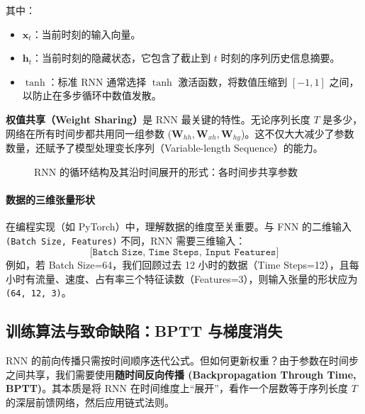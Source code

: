 其中：
\begin{itemize}
    \item $\mathbf{x}_t$：当前时刻的输入向量。
    \item $\mathbf{h}_t$：当前时刻的隐藏状态，它包含了截止到 $t$ 时刻的序列历史信息摘要。
    \item $\tanh$：标准 RNN 通常选择 $\tanh$ 激活函数，将数值压缩到 $[-1, 1]$ 之间，以防止在多步循环中数值发散。
\end{itemize}

\textbf{权值共享（Weight Sharing）}是 RNN 最关键的特性。无论序列长度 $T$ 是多少，网络在所有时间步都共用同一组参数 ($\mathbf{W}_{hh}, \mathbf{W}_{xh}, \mathbf{W}_{hy}$)。这不仅大大减少了参数数量，还赋予了模型处理变长序列（Variable-length Sequence）的能力。

\begin{figure}[H]
  \centering
  \resizebox{\textwidth}{!}{}
  \caption{RNN 的循环结构及其沿时间展开的形式：各时间步共享参数}
  \label{fig:ch09_orig4}
\end{figure}

\paragraph{数据的三维张量形状}
在编程实现（如 PyTorch）中，理解数据的维度至关重要。与 FNN 的二维输入 \texttt{(Batch Size, Features)} 不同，RNN 需要三维输入：
\begin{equation}
    \texttt{[Batch Size, Time Steps, Input Features]}
\end{equation}
例如，若 Batch Size=64，我们回顾过去 12 小时的数据（Time Steps=12），且每小时有流量、速度、占有率三个特征读数（Features=3），则输入张量的形状应为 \texttt{(64, 12, 3)}。

\subsection{训练算法与致命缺陷：BPTT 与梯度消失}
\label{subsec:bptt}

RNN 的前向传播只需按时间顺序迭代公式。但如何更新权重？由于参数在时间步之间共享，我们需要使用\textbf{随时间反向传播 (Backpropagation Through Time, BPTT)}。其本质是将 RNN 在时间维度上“展开”，看作一个层数等于序列长度 $T$ 的深层前馈网络，然后应用链式法则。

